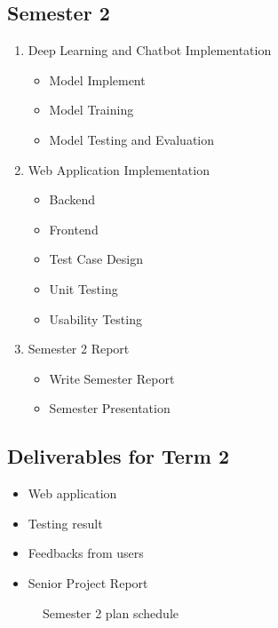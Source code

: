 \documentclass[12pt,oneside,openright,a4paper]{cpe-english-project}
\begin{document}
    \subsection{Semester 2}
      \begin{enumerate}
        \item Deep Learning and Chatbot Implementation
          \begin{itemize}
            \item Model Implement
            \item Model Training
            \item Model Testing and Evaluation
          \end{itemize}
        \item Web Application Implementation
          \begin{itemize}
            \item Backend
            \item Frontend
            \item Test Case Design
            \item Unit Testing
            \item Usability Testing
          \end{itemize}
        \item Semester 2 Report
          \begin{itemize}
            \item Write Semester Report
            \item Semester Presentation
          \end{itemize}
      \end{enumerate}

    \subsection*{Deliverables for Term 2}
      \begin{itemize}
        \item Web application
        \item Testing result
        \item Feedbacks from users
        \item Senior Project Report
      \end{itemize}
      \begin{figure}[!h]
        \centering
        \caption{Semester 2 plan schedule}\label{fig:Term2_Gantt}
      \end{figure}
\end{document}
